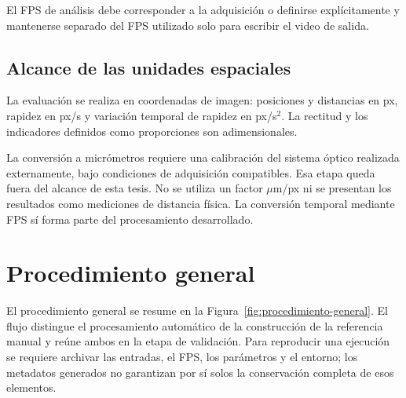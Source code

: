 El FPS de análisis debe corresponder a la adquisición o definirse explícitamente y mantenerse separado del FPS utilizado solo para escribir el video de salida.

\subsection{Alcance de las unidades espaciales}

La evaluación se realiza en coordenadas de imagen: posiciones y distancias en px, rapidez en px/s y variación temporal de rapidez en px/s$^2$. La rectitud y los indicadores definidos como proporciones son adimensionales.

La conversión a micrómetros requiere una calibración del sistema óptico realizada externamente, bajo condiciones de adquisición compatibles. Esa etapa queda fuera del alcance de esta tesis. No se utiliza un factor $\mu$m/px ni se presentan los resultados como mediciones de distancia física. La conversión temporal mediante FPS sí forma parte del procesamiento desarrollado.

\section{Procedimiento general}

El procedimiento general se resume en la Figura~\ref{fig:procedimiento-general}. El flujo distingue el procesamiento automático de la construcción de la referencia manual y reúne ambos en la etapa de validación. Para reproducir una ejecución se requiere archivar las entradas, el FPS, los parámetros y el entorno; los metadatos generados no garantizan por sí solos la conservación completa de esos elementos.

